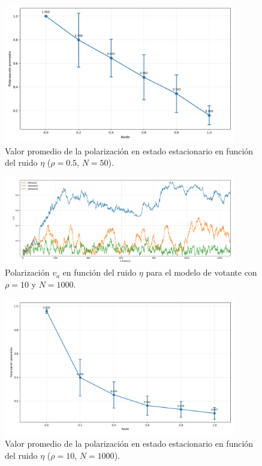 \documentclass{article}
\begin{document}
\begin{figure}[H]
\centering
\includegraphics[width=0.9\textwidth]{Average voter dens 05 variando ruido.png}
\caption{Valor promedio de la polarización en estado estacionario en función del ruido $\eta$ ($\rho = 0.5$, $N = 50$).}
\label{fig:promedio_va_eta_voter}
\end{figure}

\begin{figure}[H]
\centering
\includegraphics[width=0.9\textwidth]{Voter Densidad 10 Variando ruido.png}
\caption{Polarización $v_a$ en función del ruido $\eta$ para el modelo de votante con $\rho = 10$ y $N = 1000$.}
\label{fig:va_vs_eta_voter2}
\end{figure}

\begin{figure}[H]
\centering
\includegraphics[width=0.9\textwidth]{Average voter dens 10 variando ruido.png}
\caption{Valor promedio de la polarización en estado estacionario en función del ruido $\eta$ ($\rho = 10$, $N = 1000$).}
\label{fig:promedio_va_eta_voter2}
\end{figure}
\end{document}
